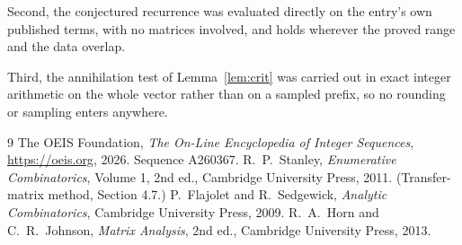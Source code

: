 \documentclass[11pt,a4paper]{article}
\theoremstyle{plain}
\theoremstyle{definition}
\begin{document}
Second, the conjectured recurrence was evaluated directly on the entry's own published terms,
with no matrices involved, and holds wherever the proved range and the data overlap.

Third, the annihilation test of Lemma~\ref{lem:crit} was carried out in exact integer
arithmetic on the whole vector rather than on a sampled prefix, so no rounding or sampling
enters anywhere.

\begin{thebibliography}{9}
 The OEIS Foundation, \emph{The On-Line Encyclopedia of Integer
Sequences}, \url{https://oeis.org}, 2026. Sequence A260367.
 R.~P.~Stanley, \emph{Enumerative Combinatorics}, Volume 1, 2nd ed.,
Cambridge University Press, 2011. (Transfer-matrix method, Section 4.7.)
 P.~Flajolet and R.~Sedgewick, \emph{Analytic Combinatorics}, Cambridge
University Press, 2009.
 R.~A.~Horn and C.~R.~Johnson, \emph{Matrix Analysis}, 2nd ed., Cambridge
University Press, 2013.
\end{thebibliography}
\end{document}
